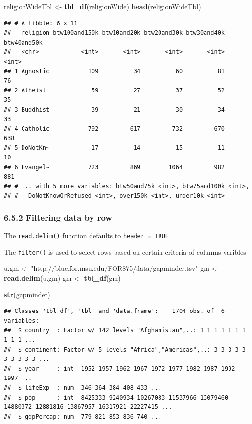 \documentclass[]{article}
\newenvironment{Shaded}{\begin{snugshade}}{\end{snugshade}}
\newcommand{\KeywordTok}[1]{\textcolor[rgb]{0.13,0.29,0.53}{\textbf{#1}}}
\newcommand{\StringTok}[1]{\textcolor[rgb]{0.31,0.60,0.02}{#1}}
\newcommand{\NormalTok}[1]{#1}
\begin{document}
\begin{Shaded}
\begin{Highlighting}[]
\NormalTok{religionWideTbl <-}\StringTok{ }\KeywordTok{tbl_df}\NormalTok{(religionWide)}
\KeywordTok{head}\NormalTok{(religionWideTbl)}
\end{Highlighting}
\end{Shaded}

\begin{verbatim}
## # A tibble: 6 x 11
##   religion btw100and150k btw10and20k btw20and30k btw30and40k btw40and50k
##   <chr>            <int>       <int>       <int>       <int>       <int>
## 1 Agnostic           109          34          60          81          76
## 2 Atheist             59          27          37          52          35
## 3 Buddhist            39          21          30          34          33
## 4 Catholic           792         617         732         670         638
## 5 DoNotKn~            17          14          15          11          10
## 6 Evangel~           723         869        1064         982         881
## # ... with 5 more variables: btw50and75k <int>, btw75and100k <int>,
## #   DoNotKnowOrRefused <int>, over150k <int>, under10k <int>
\end{verbatim}

\subsubsection{6.5.2 Filtering data by row}\label{filtering-data-by-row}

The \texttt{read.delim()} function defaults to \texttt{header\ =\ TRUE}

The \texttt{filter()} is used to select rows based on certain criteria
of columns varibles

\begin{Shaded}
\begin{Highlighting}[]
\NormalTok{u.gm <-}\StringTok{ "http://blue.for.msu.edu/FOR875/data/gapminder.tsv"}
\NormalTok{gm <-}\StringTok{ }\KeywordTok{read.delim}\NormalTok{(u.gm)}
\NormalTok{gm <-}\StringTok{ }\KeywordTok{tbl_df}\NormalTok{(gm)}

\KeywordTok{str}\NormalTok{(gapminder)}
\end{Highlighting}
\end{Shaded}

\begin{verbatim}
## Classes 'tbl_df', 'tbl' and 'data.frame':    1704 obs. of  6 variables:
##  $ country  : Factor w/ 142 levels "Afghanistan",..: 1 1 1 1 1 1 1 1 1 1 ...
##  $ continent: Factor w/ 5 levels "Africa","Americas",..: 3 3 3 3 3 3 3 3 3 3 ...
##  $ year     : int  1952 1957 1962 1967 1972 1977 1982 1987 1992 1997 ...
##  $ lifeExp  : num  346 364 384 408 433 ...
##  $ pop      : int  8425333 9240934 10267083 11537966 13079460 14880372 12881816 13867957 16317921 22227415 ...
##  $ gdpPercap: num  779 821 853 836 740 ...
\end{verbatim}
\end{document}
